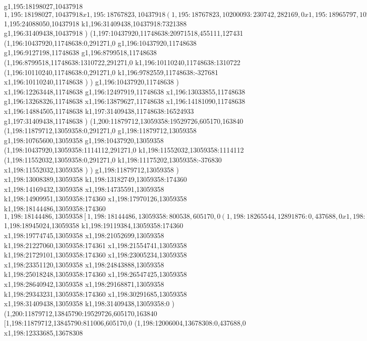 {g1,195:18198027,10437918
$1,195:18198027,10437918
x1,195:18767823,10437918
(1,195:18767823,10200093:230742,282169,0
x1,195:18965797,10200093
)
g1,195:19180605,10437918
x1,195:19835966,10437918
g1,195:20018006,10437918
x1,195:20743452,10437918
g1,195:20925492,10437918
x1,195:21107537,10437918
g1,195:21289577,10437918
x1,195:21630760,10437918
x1,195:22558882,10437918
g1,195:22740922,10437918
x1,195:23250648,10437918
g1,195:23432688,10437918
x1,195:24088050,10437918
$1,195:24088050,10437918
k1,196:31409438,10437918:7321388
g1,196:31409438,10437918
)
(1,197:10437920,11748638:20971518,455111,127431
(1,196:10437920,11748638:0,291271,0
g1,196:10437920,11748638
g1,196:9127198,11748638
g1,196:8799518,11748638
(1,196:8799518,11748638:1310722,291271,0
k1,196:10110240,11748638:1310722
(1,196:10110240,11748638:0,291271,0
k1,196:9782559,11748638:-327681
x1,196:10110240,11748638
)
)
g1,196:10437920,11748638
)
x1,196:12263448,11748638
g1,196:12497919,11748638
x1,196:13033855,11748638
g1,196:13268326,11748638
x1,196:13879627,11748638
x1,196:14181090,11748638
x1,196:14884505,11748638
k1,197:31409438,11748638:16524933
g1,197:31409438,11748638
)
(1,200:11879712,13059358:19529726,605170,163840
(1,198:11879712,13059358:0,291271,0
g1,198:11879712,13059358
g1,198:10765600,13059358
g1,198:10437920,13059358
(1,198:10437920,13059358:1114112,291271,0
k1,198:11552032,13059358:1114112
(1,198:11552032,13059358:0,291271,0
k1,198:11175202,13059358:-376830
x1,198:11552032,13059358
)
)
g1,198:11879712,13059358
)
x1,198:13008389,13059358
k1,198:13182749,13059358:174360
x1,198:14169432,13059358
x1,198:14735591,13059358
k1,198:14909951,13059358:174360
x1,198:17970126,13059358
k1,198:18144486,13059358:174360
$1,198:18144486,13059358
[1,198:18144486,13059358:800538,605170,0
(1,198:18265544,12891876:0,437688,0
x1,198:18593225,12891876
)
(1,198:18144486,13059358:800538,519994,0
x1,198:18714282,13059358
(1,198:18714282,12821533:230742,282169,0
x1,198:18912256,12821533
)
)
]
$1,198:18945024,13059358
k1,198:19119384,13059358:174360
x1,198:19774745,13059358
x1,198:21052699,13059358
k1,198:21227060,13059358:174361
x1,198:21554741,13059358
k1,198:21729101,13059358:174360
x1,198:23005234,13059358
x1,198:23351120,13059358
x1,198:24843888,13059358
k1,198:25018248,13059358:174360
x1,198:26547425,13059358
x1,198:28640942,13059358
x1,198:29168871,13059358
k1,198:29343231,13059358:174360
x1,198:30291685,13059358
x1,198:31409438,13059358
k1,198:31409438,13059358:0
)
(1,200:11879712,13845790:19529726,605170,163840
[1,198:11879712,13845790:811006,605170,0
(1,198:12006004,13678308:0,437688,0
x1,198:12333685,13678308
}
